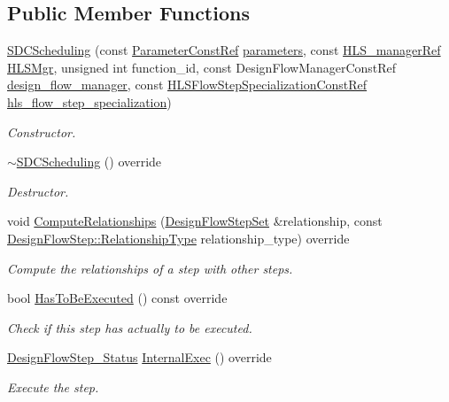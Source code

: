 \subsection*{Public Member Functions}
\begin{DoxyCompactItemize}
\item 
\hyperlink{classSDCScheduling_a892cbceb7ab8685568dd700c3cd00a2a}{S\+D\+C\+Scheduling} (const \hyperlink{Parameter_8hpp_a37841774a6fcb479b597fdf8955eb4ea}{Parameter\+Const\+Ref} \hyperlink{classDesignFlowStep_a802eaafe8013df706370679d1a436949}{parameters}, const \hyperlink{hls__manager_8hpp_acd3842b8589fe52c08fc0b2fcc813bfe}{H\+L\+S\+\_\+manager\+Ref} \hyperlink{classHLS__step_ade85003a99d34134418451ddc46a18e9}{H\+L\+S\+Mgr}, unsigned int function\+\_\+id, const Design\+Flow\+Manager\+Const\+Ref \hyperlink{classDesignFlowStep_ab770677ddf087613add30024e16a5554}{design\+\_\+flow\+\_\+manager}, const \hyperlink{hls__step_8hpp_a5fdd2edf290c196531d21d68e13f0e74}{H\+L\+S\+Flow\+Step\+Specialization\+Const\+Ref} \hyperlink{classHLS__step_a843be75ba53b81876aa3c8b870ae8a55}{hls\+\_\+flow\+\_\+step\+\_\+specialization})
\begin{DoxyCompactList}\small\item\em Constructor. \end{DoxyCompactList}\item 
\hyperlink{classSDCScheduling_ac3ba79175a36258e60ebf591fb0054e4}{$\sim$\+S\+D\+C\+Scheduling} () override
\begin{DoxyCompactList}\small\item\em Destructor. \end{DoxyCompactList}\item 
void \hyperlink{classSDCScheduling_a28390f2bb68bc997c4827f5dbd240ca5}{Compute\+Relationships} (\hyperlink{classDesignFlowStepSet}{Design\+Flow\+Step\+Set} \&relationship, const \hyperlink{classDesignFlowStep_a723a3baf19ff2ceb77bc13e099d0b1b7}{Design\+Flow\+Step\+::\+Relationship\+Type} relationship\+\_\+type) override
\begin{DoxyCompactList}\small\item\em Compute the relationships of a step with other steps. \end{DoxyCompactList}\item 
bool \hyperlink{classSDCScheduling_a2c5241704adbd9ab53968c7cbf549560}{Has\+To\+Be\+Executed} () const override
\begin{DoxyCompactList}\small\item\em Check if this step has actually to be executed. \end{DoxyCompactList}\item 
\hyperlink{design__flow__step_8hpp_afb1f0d73069c26076b8d31dbc8ebecdf}{Design\+Flow\+Step\+\_\+\+Status} \hyperlink{classSDCScheduling_afd40bf8d626a3ad4f3a6943365933833}{Internal\+Exec} () override
\begin{DoxyCompactList}\small\item\em Execute the step. \end{DoxyCompactList}\end{DoxyCompactItemize}
